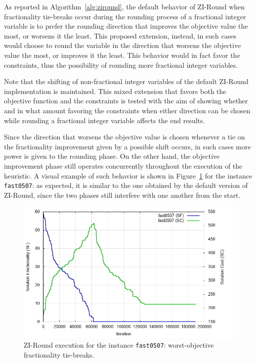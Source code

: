 \documentclass[a4paper,12pt,twoside]{scrbook}
\begin{document}
As reported in Algorithm~\ref{alg:ziround}, the default behavior of ZI-Round when fractionality tie-breaks occur during the rounding process of a fractional integer variable is to prefer the rounding direction that improves the objective value the most, or worsens it the least. This proposed extension, instead, in such cases would choose to round the variable in the direction that worsens the objective value the most, or improves it the least. This behavior would in fact favor the constraints, thus the possibility of rounding more fractional integer variables. \par

Note that the shifting of non-fractional integer variables of the default ZI-Round implementation is maintained. This mixed extension that favors both the objective function and the constraints is tested with the aim of showing whether and in what amount favoring the constraints when either direction can be chosen while rounding a fractional integer variable affects the end results. \par 

Since the direction that worsens the objective value is chosen whenever a tie on the fractionality improvement given by a possible shift occurs, in such cases more power is given to the rounding phase. On the other hand, the objective improvement phase still operates concurrently throughout the execution of the heuristic. A visual example of such behavior is shown in Figure~\ref{fig:exzi-fractieworstobj} for the instance \texttt{fast0507}: as expected, it is similar to the one obtained by the default version of ZI-Round, since the two phases still interfere with one another from the start.
\begin{figure}[ht]
	\centering
	\includegraphics[width=\textwidth]{fast0507-fractieworstobj.png}
	\caption{ZI-Round execution for the instance \texttt{fast0507}: worst-objective fractionality tie-breaks.}
	\label{fig:exzi-fractieworstobj}
\end{figure}
\end{document}
